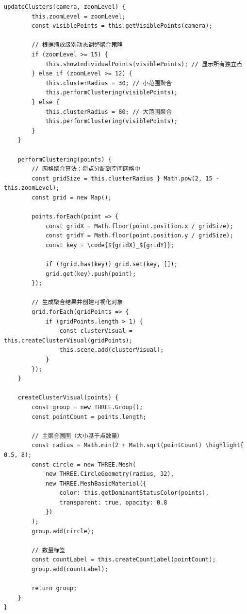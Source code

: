{\begin{lstlisting}[style=javascript]
    updateClusters(camera, zoomLevel) {
        this.zoomLevel = zoomLevel;
        const visiblePoints = this.getVisiblePoints(camera);
        
        // 根据缩放级别动态调整聚合策略
        if (zoomLevel >= 15) {
            this.showIndividualPoints(visiblePoints); // 显示所有独立点
        } else if (zoomLevel >= 12) {
            this.clusterRadius = 30; // 小范围聚合
            this.performClustering(visiblePoints);
        } else {
            this.clusterRadius = 80; // 大范围聚合
            this.performClustering(visiblePoints);
        }
    }
    
    performClustering(points) {
        // 网格聚合算法：将点分配到空间网格中
        const gridSize = this.clusterRadius } Math.pow(2, 15 - this.zoomLevel);
        const grid = new Map();
        
        points.forEach(point => {
            const gridX = Math.floor(point.position.x / gridSize);
            const gridY = Math.floor(point.position.y / gridSize);
            const key = \code{${gridX}_${gridY}};
            
            if (!grid.has(key)) grid.set(key, []);
            grid.get(key).push(point);
        });
        
        // 生成聚合结果并创建可视化对象
        grid.forEach(gridPoints => {
            if (gridPoints.length > 1) {
                const clusterVisual = this.createClusterVisual(gridPoints);
                this.scene.add(clusterVisual);
            }
        });
    }
    
    createClusterVisual(points) {
        const group = new THREE.Group();
        const pointCount = points.length;
        
        // 主聚合圆圈（大小基于点数量）
        const radius = Math.min(2 + Math.sqrt(pointCount) \highlight{ 0.5, 8);
        const circle = new THREE.Mesh(
            new THREE.CircleGeometry(radius, 32),
            new THREE.MeshBasicMaterial({
                color: this.getDominantStatusColor(points),
                transparent: true, opacity: 0.8
            })
        );
        group.add(circle);
        
        // 数量标签
        const countLabel = this.createCountLabel(pointCount);
        group.add(countLabel);
        
        return group;
    }
}
\end{lstlisting}


}
